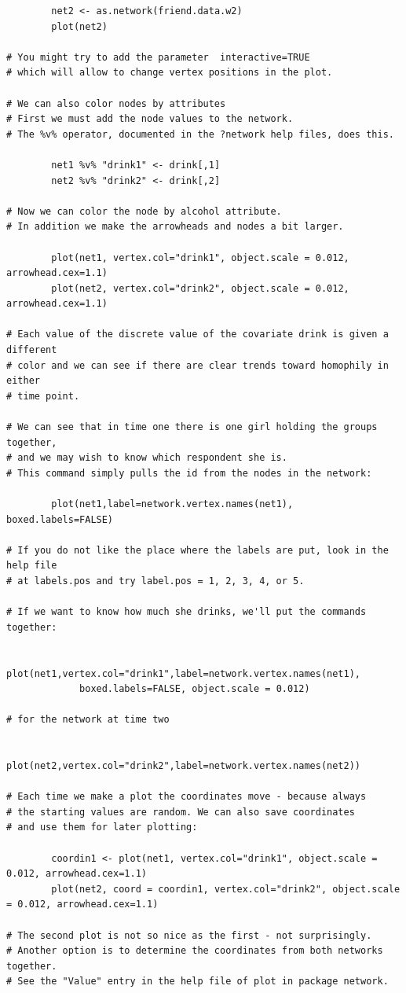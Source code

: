 \documentclass[a4paper,fleqn]{article}
\newcommand{\+}{\, + \,}
\begin{document}
{\begin{verbatim}
        net2 <- as.network(friend.data.w2)
        plot(net2)

# You might try to add the parameter  interactive=TRUE
# which will allow to change vertex positions in the plot.

# We can also color nodes by attributes
# First we must add the node values to the network.
# The %v% operator, documented in the ?network help files, does this.

        net1 %v% "drink1" <- drink[,1]
        net2 %v% "drink2" <- drink[,2]

# Now we can color the node by alcohol attribute.
# In addition we make the arrowheads and nodes a bit larger.

        plot(net1, vertex.col="drink1", object.scale = 0.012, arrowhead.cex=1.1)
        plot(net2, vertex.col="drink2", object.scale = 0.012, arrowhead.cex=1.1)

# Each value of the discrete value of the covariate drink is given a different
# color and we can see if there are clear trends toward homophily in either
# time point.

# We can see that in time one there is one girl holding the groups together,
# and we may wish to know which respondent she is.
# This command simply pulls the id from the nodes in the network:

        plot(net1,label=network.vertex.names(net1), boxed.labels=FALSE)

# If you do not like the place where the labels are put, look in the help file
# at labels.pos and try label.pos = 1, 2, 3, 4, or 5.

# If we want to know how much she drinks, we'll put the commands together:

        plot(net1,vertex.col="drink1",label=network.vertex.names(net1),
             boxed.labels=FALSE, object.scale = 0.012)

# for the network at time two

        plot(net2,vertex.col="drink2",label=network.vertex.names(net2))

# Each time we make a plot the coordinates move - because always
# the starting values are random. We can also save coordinates
# and use them for later plotting:

        coordin1 <- plot(net1, vertex.col="drink1", object.scale = 0.012, arrowhead.cex=1.1)
        plot(net2, coord = coordin1, vertex.col="drink2", object.scale = 0.012, arrowhead.cex=1.1)

# The second plot is not so nice as the first - not surprisingly.
# Another option is to determine the coordinates from both networks together.
# See the "Value" entry in the help file of plot in package network.


\end{verbatim}}
\end{document}
